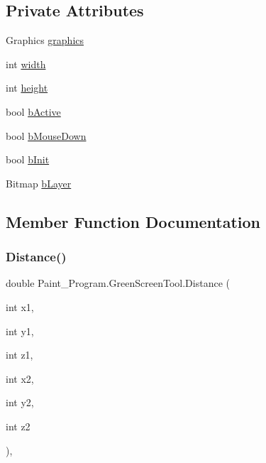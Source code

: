 \subsection*{Private Attributes}
\begin{DoxyCompactItemize}
\item 
Graphics \mbox{\hyperlink{class_paint___program_1_1_green_screen_tool_aca8f9a5ec0d983848de921e801e8ed7f}{graphics}}
\item 
int \mbox{\hyperlink{class_paint___program_1_1_green_screen_tool_ac6e91de82caa4c468999d4cbc5eca45e}{width}}
\item 
int \mbox{\hyperlink{class_paint___program_1_1_green_screen_tool_a679ac45d198acb71fb2f92e663bbbd2b}{height}}
\item 
bool \mbox{\hyperlink{class_paint___program_1_1_green_screen_tool_a0a46a665af35d9e10a0edb47ff845b19}{b\+Active}}
\item 
bool \mbox{\hyperlink{class_paint___program_1_1_green_screen_tool_a62a6e0d3f19e085a50a08bb1d9b1849d}{b\+Mouse\+Down}}
\item 
bool \mbox{\hyperlink{class_paint___program_1_1_green_screen_tool_a988a8407916d4ad8f1d82e3118886834}{b\+Init}}
\item 
Bitmap \mbox{\hyperlink{class_paint___program_1_1_green_screen_tool_a1bf0fa58eacb1bd8adf711c0f56223d4}{b\+Layer}}
\end{DoxyCompactItemize}


\subsection{Member Function Documentation}
\mbox{\label{class_paint___program_1_1_green_screen_tool_a5da8c478fc4640e8250f1186b2ae8f74}} 
\subsubsection{\texorpdfstring{Distance()}{Distance()}}
{\footnotesize\ttfamily double Paint\+\_\+\+Program.\+Green\+Screen\+Tool.\+Distance (\begin{DoxyParamCaption}\item[{int}]{x1,  }\item[{int}]{y1,  }\item[{int}]{z1,  }\item[{int}]{x2,  }\item[{int}]{y2,  }\item[{int}]{z2 }\end{DoxyParamCaption})\hspace{0.3cm}{\ttfamily [inline]}, {\ttfamily [private]}}


